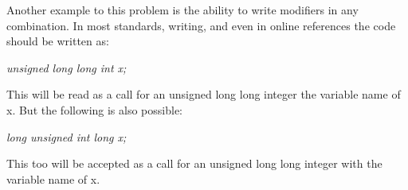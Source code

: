 \documentclass[12pt]{article}
\begin{document}
Another example to this problem is the ability to write modifiers in any combination. In most standards, writing, and even in online references the code should be written as:
\begin{center}
  \textit{unsigned long long int x;}
\end{center}

This will be read as a call for an unsigned long long integer the variable name of x. But the following is also possible:
\begin{center}
  \textit{long unsigned int long x;}
\end{center}

This too will be accepted as a call for an unsigned long long integer with the variable name of x. 







\iffalse



%
%
%

\fi
\end{document}
